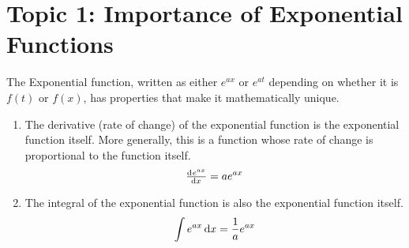 \documentclass[../notes-main.tex]{subfiles}
\begin{document}
\section{Topic 1: Importance of Exponential Functions}
The Exponential function, written as either
\(e^{ax}\) or \(e^{at}\) depending on whether it is \(f(t)\) or \(f(x)\),
has properties that make it mathematically unique.

\begin{enumerate}
    \item The derivative (rate of change) of the exponential function is the exponential function itself. More generally, this is a function whose rate of change is proportional to the function itself.
          \[
              \od{e^{ax}}{x} = ae^{ax}
          \]
    \item The integral of the exponential function is also the exponential function itself.
          \[
              \int e^{ax} \dif x = \frac{1}{a}e^{ax}
          \]
\end{enumerate}
\end{document}
